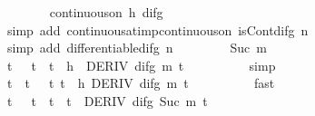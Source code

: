 \begin{isabellebody}
\ \ \ \ \ \ \isamarkupfalse%
\ {\isachardoublequoteopen}continuous{\isacharunderscore}{\kern0pt}on\ {\isacharbraceleft}{\kern0pt}{}{\isachardot}{\kern0pt}{\isachardot}{\kern0pt}h{\isacharbraceright}{\kern0pt}\ {\isacharparenleft}{\kern0pt}difg\ {}{\isacharparenright}{\kern0pt}{\isachardoublequoteclose}\isanewline
\ \ \ \ \ \ \ \ \isamarkupfalse%
\ {\isacharparenleft}{\kern0pt}simp\ add{\isacharcolon}{\kern0pt}\ continuous{\isacharunderscore}{\kern0pt}at{\isacharunderscore}{\kern0pt}imp{\isacharunderscore}{\kern0pt}continuous{\isacharunderscore}{\kern0pt}on\ isCont{\isacharunderscore}{\kern0pt}difg\ n{\isacharparenright}{\kern0pt}\isanewline
\ \ \ \ \isamarkupfalse%
\ {\isacharparenleft}{\kern0pt}simp\ add{\isacharcolon}{\kern0pt}\ differentiable{\isacharunderscore}{\kern0pt}difg\ n{\isacharparenright}{\kern0pt}\isanewline
\ \ \isamarkupfalse%
\isanewline
\ \ \ \ \isamarkupfalse%
\ {\isacharparenleft}{\kern0pt}Suc\ m{\isacharprime}{\kern0pt}{\isacharparenright}{\kern0pt}\isanewline
\ \ \ \ \isamarkupfalse%
\ \isamarkupfalse%
\ {\isachardoublequoteopen}{\isasymexists}t{\isachardot}{\kern0pt}\ {}\ {\isacharless}{\kern0pt}\ t\ {\isasymand}\ t\ {\isacharless}{\kern0pt}\ h\ {\isasymand}\ DERIV\ {\isacharparenleft}{\kern0pt}difg\ m{\isacharprime}{\kern0pt}{\isacharparenright}{\kern0pt}\ t\ {\isacharcolon}{\kern0pt}{\isachargreater}{\kern0pt}\ {}{\isachardoublequoteclose}\isanewline
\ \ \ \ \ \ \isamarkupfalse%
\ simp\isanewline
\ \ \ \ \isamarkupfalse%
\ \isamarkupfalse%
\ t\ \ t{\isacharcolon}{\kern0pt}\ {\isachardoublequoteopen}{}\ {\isacharless}{\kern0pt}\ t{\isachardoublequoteclose}\ {\isachardoublequoteopen}t\ {\isacharless}{\kern0pt}\ h{\isachardoublequoteclose}\ {\isachardoublequoteopen}DERIV\ {\isacharparenleft}{\kern0pt}difg\ m{\isacharprime}{\kern0pt}{\isacharparenright}{\kern0pt}\ t\ {\isacharcolon}{\kern0pt}{\isachargreater}{\kern0pt}\ {}{\isachardoublequoteclose}\isanewline
\ \ \ \ \ \ \isamarkupfalse%
\ fast\isanewline
\ \ \ \ \isamarkupfalse%
\ {\isachardoublequoteopen}{\isasymexists}t{\isacharprime}{\kern0pt}{\isachardot}{\kern0pt}\ {}\ {\isacharless}{\kern0pt}\ t{\isacharprime}{\kern0pt}\ {\isasymand}\ t{\isacharprime}{\kern0pt}\ {\isacharless}{\kern0pt}\ t\ {\isasymand}\ DERIV\ {\isacharparenleft}{\kern0pt}difg\ {\isacharparenleft}{\kern0pt}Suc\ m{\isacharprime}{\kern0pt}{\isacharparenright}{\kern0pt}{\isacharparenright}{\kern0pt}\ t{\isacharprime}{\kern0pt}\ {\isacharcolon}{\kern0pt}{\isachargreater}{\kern0pt}\ {}{\isachardoublequoteclose}\isanewline

\end{isabellebody}
